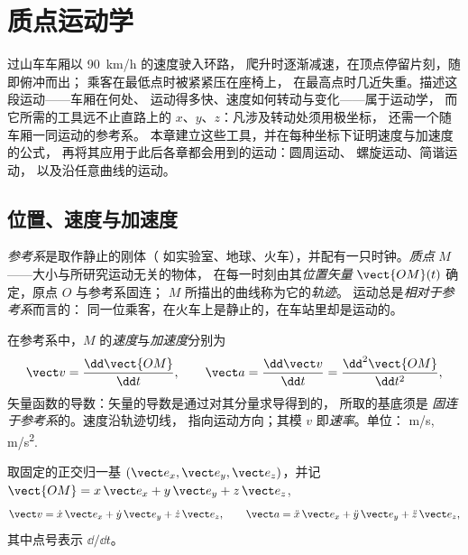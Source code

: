 \chapter{质点运动学}\label{ch:b1:point-kinematics}

过山车车厢以 \qty{90}{km/h} 的速度驶入环路，
爬升时逐渐减速，在顶点停留片刻，随即俯冲而出；
乘客在最低点时被紧紧压在座椅上，
在最高点时几近失重。描述这段运动——车厢在何处、
运动得多快、速度如何转动与变化——属于运动学，
而它所需的工具远不止直路上的 $x$、$y$、$z$：凡涉及转动处须用极坐标，
还需一个随车厢一同运动的参考系。
本章建立这些工具，并在每种坐标下证明速度与加速度的公式，
再将其应用于此后各章都会用到的运动：圆周运动、
螺旋运动、简谐运动，
以及沿任意曲线的运动。

\section{位置、速度与加速度}

\begin{definition}[参考系；位置；轨迹]\label{def:b1:point-kinematics:frame}
\emph{参考系}是取作静止的刚体（
如实验室、地球、火车），并配有一只时钟。\emph{质点}
$M$——大小与所研究运动无关的物体，
在每一时刻由其\emph{位置矢量}
$\vect{OM}(t)$ 确定，原点 $O$ 与参考系固连；
$M$ 所描出的曲线称为它的\emph{轨迹}。
运动总是\emph{相对于参考系}而言的：
同一位乘客，在火车上是静止的，在车站里却是运动的。
\end{definition}

\begin{definition}[速度与加速度]\label{def:b1:point-kinematics:velocity}
在参考系中，$M$ 的\emph{速度}与\emph{加速度}分别为
\[
\vect v = \frac{\dd\vect{OM}}{\dd t}, \qquad
\vect a = \frac{\dd\vect v}{\dd t} = \frac{\dd^2\vect{OM}}{\dd t^2},
\]
矢量函数的导数：矢量的导数是通过对其分量求导得到的，
所取的基底须是
\emph{固连于参考系}的。速度沿轨迹切线，
指向运动方向；其模 $v$ 即\emph{速率}。单位：
\unit{m/s}, \unit{m/s^2}.
\end{definition}

\begin{proposition}[直角坐标]\label{prop:b1:point-kinematics:cartesian}
取固定的正交归一基 $(\vect e_x, \vect e_y, \vect e_z)$，并记
$\vect{OM} = x\,\vect e_x + y\,\vect e_y + z\,\vect e_z$,
\[
\vect v = \dot x\,\vect e_x + \dot y\,\vect e_y + \dot z\,\vect e_z, \qquad
\vect a = \ddot x\,\vect e_x + \ddot y\,\vect e_y + \ddot z\,\vect e_z,
\]
其中点号表示 $\dd/\dd t$。
\end{proposition}

